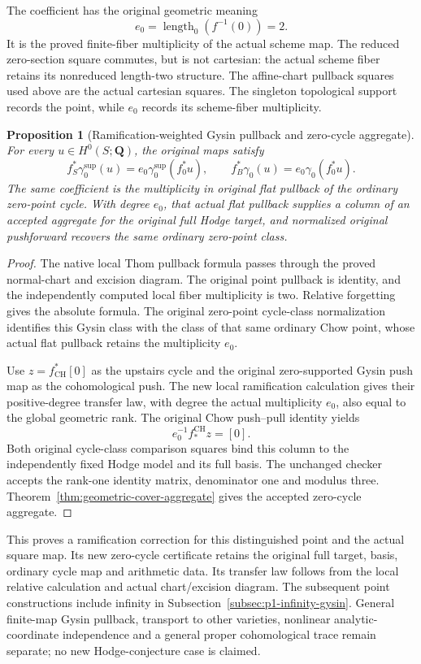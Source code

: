 \documentclass[11pt]{article}
\newtheorem{proposition}[theorem]{Proposition}
\theoremstyle{definition}
\theoremstyle{remark}
\DeclareMathOperator{\CH}{CH}
\newcommand{\Q}{\mathbf Q}
\begin{document}
The coefficient has the original geometric meaning
\[
 e_0=\operatorname{length}_0(f^{-1}(0))=2.
\]
It is the proved finite-fiber multiplicity of the actual scheme map.
The reduced zero-section square commutes, but is not cartesian: the
actual scheme fiber retains its nonreduced length-two structure. The
affine-chart pullback squares used above are the actual cartesian
squares. The singleton topological support records the point, while
\(e_0\) records its scheme-fiber multiplicity.

\begin{proposition}[Ramification-weighted Gysin pullback and zero-cycle aggregate]
\label{prop:p1-square-ramification}
For every \(u\in H^0(S;\Q)\), the original maps satisfy
\[
 f_S^*\gamma^{\mathrm{sup}}_0(u)
      =e_0\gamma^{\mathrm{sup}}_0(f_0^*u),
 \qquad
 f_B^*\gamma_0(u)=e_0\gamma_0(f_0^*u).
\]
The same coefficient is the multiplicity in original flat pullback of
the ordinary zero-point cycle. With degree \(e_0\), that actual flat
pullback supplies a column of an accepted aggregate for the original
full Hodge target, and normalized original pushforward recovers the
same ordinary zero-point class.
\end{proposition}
\begin{proof}
The native local Thom pullback formula passes through the proved
normal-chart and excision diagram. The original point pullback is
identity, and the independently computed local fiber multiplicity is
two. Relative forgetting gives the absolute formula. The original
zero-point cycle-class normalization identifies this Gysin class with
the class of that same ordinary Chow point, whose actual flat pullback
retains the multiplicity \(e_0\).

Use \(z=f_{\CH}^*[0]\) as the upstairs cycle and the original
zero-supported Gysin push map as the cohomological push. The new local
ramification calculation gives their positive-degree transfer law,
with degree the actual multiplicity \(e_0\), also equal to the global
geometric rank. The original Chow push--pull identity yields
\[
 e_0^{-1} f_*^{\CH}z=[0].
\]
Both original cycle-class comparison squares bind this column to the
independently fixed Hodge model and its full basis. The unchanged
checker accepts the rank-one identity matrix, denominator one and
modulus three. Theorem~\ref{thm:geometric-cover-aggregate} gives the
accepted zero-cycle aggregate.
\end{proof}

This proves a ramification correction for this distinguished point and
the actual square map. Its new zero-cycle certificate retains the
original full target, basis, ordinary cycle map and arithmetic data.
Its transfer law follows from the local relative calculation and
actual chart/excision diagram. The subsequent point constructions include
infinity in Subsection~\ref{subsec:p1-infinity-gysin}. General finite-map
Gysin pullback, transport to other varieties, nonlinear analytic-coordinate
independence and a general proper cohomological trace remain separate;
no new Hodge-conjecture case is claimed.
\end{document}
